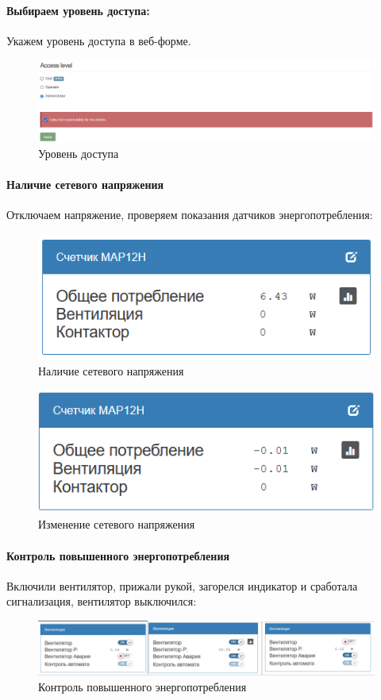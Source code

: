 \documentclass[a4paper,14pt]{extarticle}
\begin{document}
\paragraph {Выбираем уровень доступа:}
Укажем уровень доступа в веб-форме.
\begin{figure}[hbpt]
	\centering
	\includegraphics[width=0.6\linewidth]{images/access}
	\caption{Уровень доступа}
	\label{fig:access}
\end{figure}

\paragraph {Наличие сетевого напряжения}
Отключаем напряжение, проверяем показания датчиков энергопотребления:

\begin{figure}[hbpt]
	\centering
	\includegraphics[width=0.5\linewidth]{images/net1}
	\caption{Наличие сетевого напряжения}
	\label{fig:net1}
\end{figure}
\newpage
\begin{figure}[hbpt]
	\centering
	\includegraphics[width=0.5\linewidth]{images/net2}
	\caption{Изменение сетевого напряжения}
	\label{fig:net2}
\end{figure}

\paragraph{Контроль повышенного энергопотребления}
Включили вентилятор, прижали рукой, загорелся индикатор и сработала сигнализация, вентилятор выключился:
\begin{figure}[hbpt]
	\centering
	\includegraphics[width=0.6\linewidth]{images/fan-gui}
	\caption{Контроль повышенного энергопотребления}
	\label{fig:fan-gui}
\end{figure}
\end{document}
